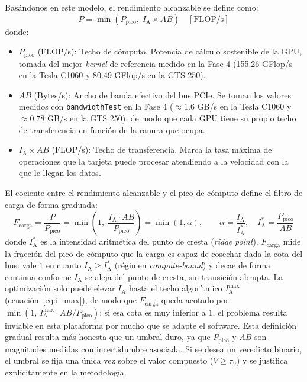 \documentclass[a4paper,11pt]{article}
\begin{document}
Basándonos en este modelo, el rendimiento alcanzable se define como:
\begin{equation}\label{eq:roofline}
    P = \min\left(P_{\text{pico}},\; I_{\text{A}} \times AB\right) \quad \left[\text{FLOP/s}\right]
\end{equation}
donde:
\begin{itemize}[leftmargin=*,noitemsep,topsep=2pt]
    \item $P_{\text{pico}}$ (FLOP/s): Techo de cómputo. Potencia de cálculo sostenible de la GPU, tomada del mejor
    \textit{kernel} de referencia medido en la Fase 4 (155.26 GFlop/s en la Tesla C1060 y 80.49 GFlop/s en la GTS 250).
    \item $AB$ (Bytes/s): Ancho de banda efectivo del bus PCIe. Se toman los valores medidos con \texttt{bandwidthTest}
    en la Fase 4 ($\approx 1.6$ GB/s en la Tesla C1060 y $\approx 0.78$ GB/s en la GTS 250), de modo que cada GPU
    tiene su propio techo de transferencia en función de la ranura que ocupa.
    \item $I_{\text{A}} \times AB$ (FLOP/s): Techo de transferencia. Marca la tasa máxima de operaciones que la tarjeta
    puede procesar atendiendo a la velocidad con la que le llegan los datos.
\end{itemize}

El cociente entre el rendimiento alcanzable y el pico de cómputo define el filtro de carga de forma graduada:
\begin{equation}\label{eq:f_carga}
    F_{\text{carga}} = \frac{P}{P_{\text{pico}}}
                    = \min\left(1,\; \frac{I_{\text{A}} \cdot AB}{P_{\text{pico}}}\right)
                    = \min(1, \alpha), \qquad
    \alpha = \frac{I_{\text{A}}}{I_{\text{A}}^*}, \quad I_{\text{A}}^* = \frac{P_{\text{pico}}}{AB}
\end{equation}
donde $I_{\text{A}}^*$ es la intensidad aritmética del punto de cresta (\textit{ridge point}). $F_{\text{carga}}$ mide la fracción
del pico de cómputo que la carga es capaz de cosechar dada la cota del bus: vale $1$ en cuanto $I_{\text{A}} \ge I_{\text{A}}^*$
(régimen \textit{compute-bound}) y decae de forma continua conforme $I_{\text{A}}$ se aleja del punto de cresta, sin transición
abrupta. La optimización solo puede elevar $I_{\text{A}}$ hasta el techo algorítmico $I_{\text{A}}^{\max}$ (ecuación~\eqref{eq:i_max}),
de modo que $F_{\text{carga}}$ queda acotado por $\min(1,\, I_{\text{A}}^{\max} \cdot AB / P_{\text{pico}})$: si esa cota es muy
inferior a $1$, el problema resulta inviable en esta plataforma por mucho que se adapte el software. Esta definición gradual resulta más honesta que un umbral duro, ya que $P_{\text{pico}}$ y $AB$ son magnitudes medidas
con incertidumbre asociada. Si se desea un veredicto binario, el umbral se fija una única vez sobre el valor compuesto
($V \ge \tau_V$) y se justifica explícitamente en la metodología.
\end{document}
